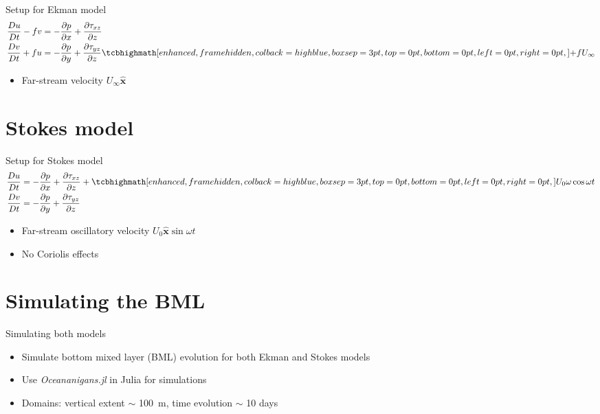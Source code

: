 \documentclass[handout]{beamer}
\begin{document}
\begin{frame}{Setup for Ekman model}
    \begin{align}
    \codev{u}{t} - fv &= -\partialdev{p}{x} + \partialdev{\tau_{xz}}{z} \\
    \codev{v}{t} + fu &= -\partialdev{p}{y} + \partialdev{\tau_{yz}}{z} \mathhighlight{highblue}{+ fU_\infty}
    \end{align}
    \begin{itemize}
        \item Far-stream velocity \(U_\infty \hat{\mathbf{x}}\)
    \end{itemize}
\end{frame}

\section{Stokes model}

\begin{frame}{Setup for Stokes model}
    \begin{align}
    \codev{u}{t} &= -\partialdev{p}{x} + \partialdev{\tau_{xz}}{z} + \mathhighlight{highblue}{U_0 \omega \cos \omega t} \\
    \codev{v}{t} &= -\partialdev{p}{y} + \partialdev{\tau_{yz}}{z}
    \end{align}

    \begin{itemize}[<+->]
        \item Far-stream oscillatory velocity \(U_0 \hat{\mathbf{x}}\sin \omega t\)
        \item No Coriolis effects
    \end{itemize}
\end{frame}

\section{Simulating the BML}

\begin{frame}{Simulating both models}
    \begin{itemize}
        \item Simulate bottom mixed layer (BML) evolution for both Ekman and Stokes models
        \item Use \emph{Oceananigans.jl} in Julia for simulations
        \item Domains: vertical extent \(\sim\) \qty{100}{\metre}, time evolution \(\sim\) 10 days
    \end{itemize}
\end{frame}
\end{document}
